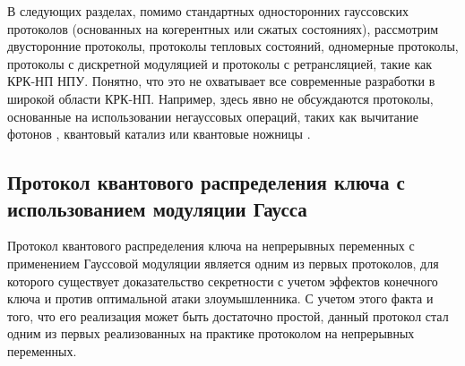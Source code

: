 В следующих разделах, помимо стандартных односторонних гауссовских протоколов (основанных на когерентных или сжатых состояниях), рассмотрим двусторонние протоколы, протоколы тепловых состояний, одномерные  протоколы, протоколы с дискретной модуляцией и протоколы с ретрансляцией, такие как КРК-НП НПУ. Понятно, что это не охватывает все современные разработки в широкой области КРК-НП. Например, здесь  явно не обсуждаются протоколы, основанные на использовании негауссовых операций, таких как вычитание фотонов \cite{guo2017}, квантовый катализ \cite{guo2019} или квантовые ножницы \cite{ghalaii2020}.


\subsection{Протокол квантового распределения ключа с использованием модуляции Гаусса}\label{sec:ch1/sect4/GG02}
Протокол квантового распределения ключа на непрерывных переменных с применением Гауссовой модуляции является одним из первых протоколов, для которого существует доказательство секретности с учетом эффектов конечного ключа и против оптимальной атаки злоумышленника. С учетом этого факта и того, что его реализация может быть достаточно простой, данный протокол стал одним из первых реализованных на практике протоколом на непрерывных переменных. 
